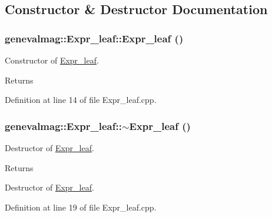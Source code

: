 \subsection{Constructor \& Destructor Documentation}
\hypertarget{classgenevalmag_1_1Expr__leaf_a5deba73ccc015e6c1d926b9d11fbefb5}{
\subsubsection[{Expr\_\-leaf}]{\setlength{\rightskip}{0pt plus 5cm}genevalmag::Expr\_\-leaf::Expr\_\-leaf ()}}
\label{classgenevalmag_1_1Expr__leaf_a5deba73ccc015e6c1d926b9d11fbefb5}
Constructor of \hyperlink{classgenevalmag_1_1Expr__leaf}{Expr\_\-leaf}. \begin{DoxyReturn}{Returns}

\end{DoxyReturn}


Definition at line 14 of file Expr\_\-leaf.cpp.

\hypertarget{classgenevalmag_1_1Expr__leaf_a435c12ce45debdded6be221b0da68c7e}{
\subsubsection[{$\sim$Expr\_\-leaf}]{\setlength{\rightskip}{0pt plus 5cm}genevalmag::Expr\_\-leaf::$\sim$Expr\_\-leaf ()}}
\label{classgenevalmag_1_1Expr__leaf_a435c12ce45debdded6be221b0da68c7e}
Destructor of \hyperlink{classgenevalmag_1_1Expr__leaf}{Expr\_\-leaf}. \begin{DoxyReturn}{Returns}

\end{DoxyReturn}
Destructor of \hyperlink{classgenevalmag_1_1Expr__leaf}{Expr\_\-leaf}. 

Definition at line 19 of file Expr\_\-leaf.cpp.



